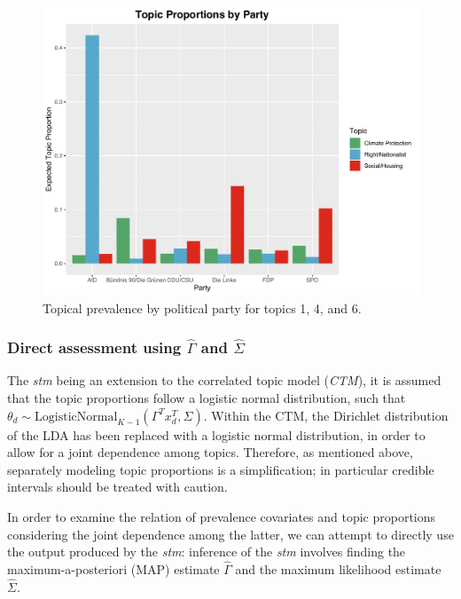 \begin{figure}[h!]
  \centering
  \captionsetup{justification=centering,margin=2cm}
  \includegraphics[scale = 0.5]{../plots/4_4/quasi_t146_cat.pdf}
  \caption{Topical prevalence by political party for topics 1, 4, and 6.}
  \label{fig:boat1}
\end{figure}

\subsubsection{Direct assessment using $\hat{\Gamma}$ and $\hat{\Sigma}$}

The \textit{stm} being an extension to the correlated topic model (\textit{CTM}), it is assumed that the topic proportions follow a logistic normal distribution, such that $\theta_d \sim \text{LogisticNormal}_{K-1}(\Gamma^Tx_d^T, \Sigma)$. Within the CTM, the Dirichlet distribution of the LDA has been replaced with a logistic normal distribution, in order to allow for a joint dependence among topics. Therefore, as mentioned above, separately modeling topic proportions is a simplification; in particular credible intervals should be treated with caution.

In order to examine the relation of prevalence covariates and topic proportions considering the joint dependence among the latter, we can attempt to directly use the output produced by the \textit{stm}: inference of the \textit{stm} involves finding the maximum-a-posteriori (MAP) estimate $\hat{\Gamma}$ and the maximum likelihood estimate $\hat{\Sigma}$. 

